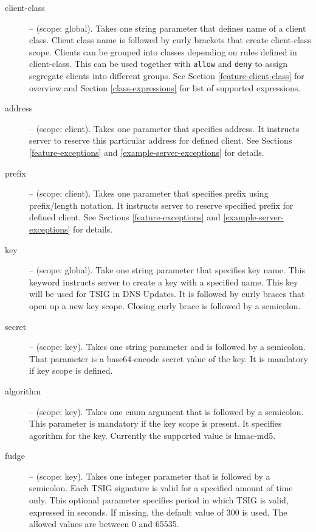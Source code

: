 \begin{description}
\item[client-class] -- (scope: global). Takes one string parameter
  that defines name of a client class. Client class name is followed
  by curly brackets that create client-class scope. Clients can be
  grouped into classes depending on rules defined in
  client-class. This can be used together with \verb+allow+ and
  \verb+deny+ to assign segregate clients into different groups. See
  Section \ref{feature-client-class} for overview and Section
  \ref{class-expressions} for list of supported expressions.

\item[address] -- (scope: client). Takes one parameter that specifies
   address. It instructs server to reserve this particular address for
   defined client. See Sections \ref{feature-exceptions}
   and \ref{example-server-exceptions} for details.

\item[prefix] -- (scope: client). Takes one parameter that specifies
   prefix using prefix/length notation. It instructs server to reserve
   specified prefix for defined client. See Sections \ref{feature-exceptions}
   and \ref{example-server-exceptions} for details.

\item[key] -- (scope: global). Take one string parameter that
   specifies key name. This keyword instructs server to create a key
   with a specified name. This key will be used for TSIG in DNS
   Updates. It is followed by curly braces that open up a new key
   scope. Closing curly brace is followed by a semicolon.

\item[secret] -- (scope: key). Takes one string parameter and is
   followed by a semicolon. That parameter is a base64-encode secret
   value of the key. It is mandatory if key scope is defined.
\item[algorithm] -- (scope: key). Takes one enum argument that is
   followed by a semicolon. This parameter is mandatory if the key
   scope is present. It specifies agorithm for the key. Currently the
   supported value is hmac-md5.
\item[fudge] -- (scope: key). Takes one integer parameter that is
   followed by a semicolon. Each TSIG signature is valid for a
   specified amount of time only. This optional parameter specifies
   period in which TSIG is valid, expressed in seconds. If missing,
   the default value of 300 is used. The allowed values are between 0
   and 65535.
\end{description}


